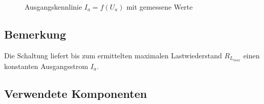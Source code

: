 \documentclass[a4paper]{hitec}
\begin{document}
\begin{figure}[H]
    \centering
    \caption{Ausgangskennlinie \textbf{$I_a = f(U_a)$} mit gemessene Werte}
\end{figure}

\clearpage

\subsection{Bemerkung}

Die Schaltung liefert bis zum ermittelten maximalen Lastwiederstand $R_{L_{max}}$ einen konstanten Ausgangsstrom $I_a$.

\subsection{Verwendete Komponenten}

\medskip

\begin{devicelist}
\end{devicelist}

\vfill

\IncludeHistoryTimeline
\end{document}

